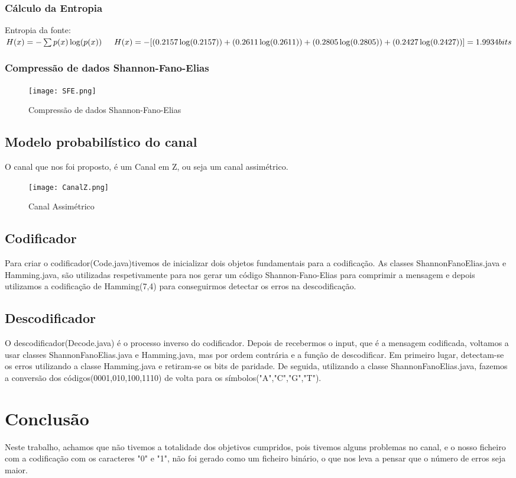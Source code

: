 \documentclass[12pt]{article}
\begin{document}
\subsubsection{Cálculo da Entropia}
\indent\indent Entropia da fonte:
\newline
\indent $H(x)=-\sum{p(x)\log(p(x))}
\newline 
\newline\indent H(x)=-[(0.2157\log(0.2157))+(0.2611\log(0.2611))+(0.2805\log(0.2805))+(0.2427\log(0.2427))]=1.9934  bits
$
\newpage
\subsubsection{Compressão de dados Shannon-Fano-Elias}
\begin{figure}[ht!]
\centering
\texttt{[image: SFE.png]}
\caption{Compressão de dados Shannon-Fano-Elias}
\label{overflow}
\end{figure}
\newpage
\subsection{Modelo probabilístico do canal}
\indent\indent O canal que nos foi proposto, é um Canal em Z, ou seja um canal assimétrico.
\begin{figure}[ht!]
\centering
\texttt{[image: CanalZ.png]}
\caption{Canal Assimétrico}
\label{overflow}
\end{figure}
\newpage
\subsection{Codificador}
\indent Para criar o codificador(Code.java)tivemos de inicializar dois objetos fundamentais para a codificação. As classes ShannonFanoElias.java e Hamming.java, são utilizadas respetivamente para nos gerar um código Shannon-Fano-Elias para comprimir a mensagem e depois utilizamos a codificação de Hamming(7,4) para conseguirmos detectar os erros na descodificação.
\newline
\newline
\newline
\subsection{Descodificador}
\indent\indent O descodificador(Decode.java) é o processo inverso do codificador. Depois de recebermos o input, que é a mensagem codificada, voltamos a usar classes ShannonFanoElias.java e Hamming.java, mas por ordem contrária e a função de descodificar. Em primeiro lugar, detectam-se os erros utilizando a classe Hamming.java e retiram-se os bits de paridade. De seguida, utilizando a classe ShannonFanoElias.java, fazemos a conversão dos códigos(0001,010,100,1110) de volta para os símbolos("A","C","G","T").
\newpage
\section{Conclusão}
\indent \indent Neste trabalho, achamos que não tivemos a totalidade dos objetivos cumpridos, pois tivemos alguns problemas no canal, e o nosso ficheiro com a codificação com os caracteres "0" e "1", não foi gerado como um ficheiro binário, o que nos leva a pensar que o número de erros seja maior.
\end{document}
